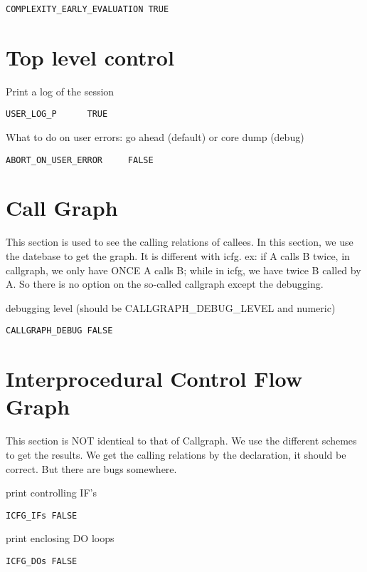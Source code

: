 \begin{verbatim}
COMPLEXITY_EARLY_EVALUATION TRUE
\end{verbatim}

\section{Top level control}

Print a log of the session

\begin{verbatim}
USER_LOG_P      TRUE
\end{verbatim}

What to do on user errors: go ahead (default) or core dump (debug)

\begin{verbatim}
ABORT_ON_USER_ERROR     FALSE
\end{verbatim}

\section{Call Graph}
This section is used to see the calling relations of callees.
In this section,
we use the datebase to get the graph. It is different with icfg.
ex: if A calls B twice, in callgraph, we only have ONCE A calls B;
while in icfg, we have twice B called by A.
So there is no option on the so-called callgraph except the debugging.

debugging level (should be CALLGRAPH_DEBUG_LEVEL and numeric)

\begin{verbatim}
CALLGRAPH_DEBUG FALSE
\end{verbatim}

\section{Interprocedural Control Flow Graph}
This section is NOT identical to that of Callgraph. 
We use the different schemes to get the results.
We get the calling relations by the declaration, it should be correct.
But there are bugs somewhere.

print controlling IF's

\begin{verbatim}
ICFG_IFs FALSE
\end{verbatim}

print enclosing DO loops

\begin{verbatim}
ICFG_DOs FALSE
\end{verbatim}

